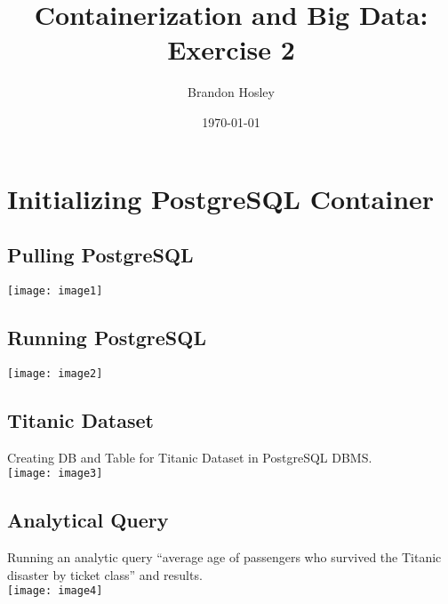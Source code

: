 \documentclass[]{article}
\title{Containerization and Big Data: Exercise 2}
\author{Brandon Hosley}
\date{\today}
\begin{document}
\maketitle

\setcounter{section}{1}
\section{Initializing PostgreSQL Container}
\subsection{Pulling PostgreSQL}
	\texttt{[image: image1]}
\subsection{Running PostgreSQL}
	\texttt{[image: image2]}
\subsection{Titanic Dataset}
	Creating DB and Table for Titanic Dataset in PostgreSQL DBMS. \\
	\texttt{[image: image3]}
\subsection{Analytical Query}
	Running an analytic query “average age of passengers who survived the Titanic 
	disaster by ticket class” and results. \\
	\texttt{[image: image4]}
\end{document}
